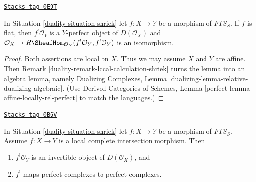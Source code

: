 \begin{lemma}
\label{duality-lemma-flat-shriek-relatively-perfect}
\href{https://stacks.math.columbia.edu/tag/0E9T}{\texttt{Stacks tag 0E9T}}

In Situation \ref{duality-situation-shriek} let $f : X \to Y$ be a morphism of
$\textit{FTS}_S$. If $f$ is flat, then
$f^!\mathcal{O}_Y$ is a $Y$-perfect object of $D(\mathcal{O}_X)$ and
$\mathcal{O}_X \to
R\SheafHom_{\mathcal{O}_X}(f^!\mathcal{O}_Y, f^!\mathcal{O}_Y)$
is an isomorphism.
\end{lemma}

\begin{proof}

Both assertions are local on $X$. Thus we may assume $X$ and $Y$ are
affine. Then Remark \ref{duality-remark-local-calculation-shriek}
turns the lemma into an algebra lemma, namely
Dualizing Complexes, Lemma \ref{dualizing-lemma-relative-dualizing-algebraic}.
(Use Derived Categories of Schemes, Lemma
\ref{perfect-lemma-affine-locally-rel-perfect} to match the languages.)
\end{proof}

\begin{lemma}
\label{duality-lemma-lci-shriek}
\href{https://stacks.math.columbia.edu/tag/0B6V}{\texttt{Stacks tag 0B6V}}

In Situation \ref{duality-situation-shriek} let $f : X \to Y$ be a morphism of
$\textit{FTS}_S$. Assume $f : X \to Y$ is a local complete
intersection morphism. Then
\begin{enumerate}
\item $f^!\mathcal{O}_Y$ is an invertible object of $D(\mathcal{O}_X)$, and
\item $f^!$ maps perfect complexes to perfect complexes.
\end{enumerate}
\end{lemma}


